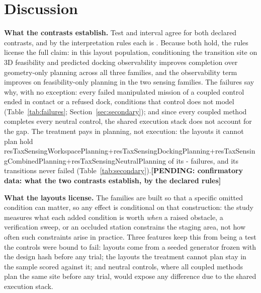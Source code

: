 \documentclass[conference]{IEEEtran}
\newcommand{\pending}[1]{\textbf{[PENDING: #1]}}
\newcommand{\withresults}[2]{\ifdefined\resTrials #1\else #2\fi}
\newcommand{\taxsum}[2]{\the\numexpr\csname resTax#1Workspace#2\endcsname+\csname resTax#1Docking#2\endcsname+\csname resTax#1Combined#2\endcsname+\csname resTax#1Neutral#2\endcsname\relax}
\begin{document}
\section{Discussion}
\withresults{\textbf{What the contrasts establish.} Test and interval agree for both declared contrasts, and by the interpretation rules each is \resClaimVsGeometry. Because both hold, the rules license the full claim: in this layout population, conditioning the transition site on 3D feasibility and predicted docking observability improves completion over geometry-only planning across all three families, and the observability term improves on feasibility-only planning in the two sensing families. The failures say why, with no exception: every failed manipulated mission of a coupled control ended in contact or a refused dock, conditions that control does not model (Table~\ref{tab:failures}; Section~\ref{sec:secondary}); and since every coupled method completes every neutral control, the shared execution stack does not account for the gap. The treatment pays in planning, not execution: the layouts it cannot plan hold \taxsum{Sensing}{Planning} of its \the\numexpr\resTrialsSensing-\resCompletedSensing\relax{} failures, and its transitions never failed (Table~\ref{tab:secondary}).}{\pending{confirmatory data: what the two contrasts establish, by the declared rules}}

\textbf{What the layouts license.} The families are built so that a specific omitted condition can matter, so any effect is conditional on that construction: the study measures what each added condition is worth \emph{when} a raised obstacle, a verification sweep, or an occluded station constrains the staging area, not how often such constraints arise in practice. Three features keep this from being a test the controls were bound to fail: layouts come from a seeded generator frozen with the design hash before any trial; the layouts the treatment cannot plan stay in the sample scored against it; and neutral controls, where all coupled methods plan the same site before any trial, would expose any difference due to the shared execution stack.
\end{document}
